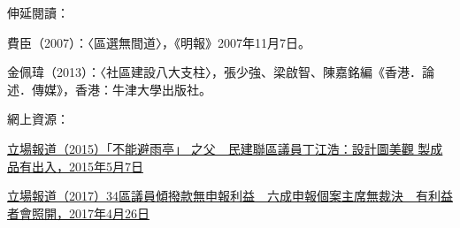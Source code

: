 伸延閱讀：

費臣（2007）：〈區選無間道〉，《明報》2007年11月7日。

金佩瑋（2013）：〈社區建設八大支柱〉，張少強、梁啟智、陳嘉銘編《香港．論述．傳媒》，香港：牛津大學出版社。

網上資源：

\href{https://thestandnews.com/society/不能避雨亭-之父-民建聯區議員丁江浩-設計圖美觀-製成品有出入/ }{立場報道（2015）「不能避雨亭」 之父　民建聯區議員丁江浩：設計圖美觀 製成品有出入，2015年5月7日}

\href{https://www.thestandnews.com/politics/審計報告-34區議員討論撥款時-無申報利益/}{立場報道（2017）34區議員傾撥款無申報利益　六成申報個案主席無裁決　有利益者會照開，2017年4月26日}
